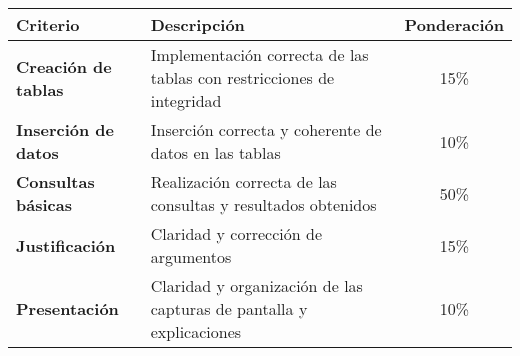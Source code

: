 \begin{tabular}{|l|l|c|}
\hline
\textbf{Criterio} & \textbf{Descripción} & \textbf{Ponderación} \\
\hline
\textbf{Creación de tablas} & Implementación correcta de las tablas con restricciones de integridad & 15\% \\
\hline
\textbf{Inserción de datos} & Inserción correcta y coherente de datos en las tablas & 10\% \\
\hline
\textbf{Consultas básicas} & Realización correcta de las consultas y resultados obtenidos & 50\% \\
\hline
\textbf{Justificación} & Claridad y corrección de argumentos & 15\% \\
\hline
\textbf{Presentación} & Claridad y organización de las capturas de pantalla y explicaciones & 10\% \\
\hline
\end{tabular}


